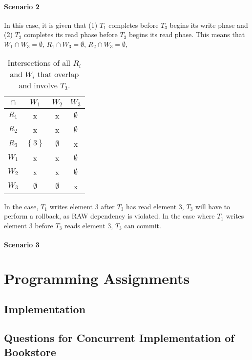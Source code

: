 \documentclass[11pt,a4paper,english]{article}
\begin{document}
\paragraph{Scenario 2} In this case, it is given that (1) $T_{1}$ completes before $T_{3}$ begins its write phase and (2) $T_{2}$ completes its read phase before $T_{3}$ begins its read phase. This means that $W_{1} \cap W_{3} = \emptyset$, $R_{1} \cap W_{3} = \emptyset$, $R_{2} \cap W_{3} = \emptyset$, 
\begin{table}[!hbt]
\centering
\begin{tabular}{|c|c|c|c|}
\hline
$\cap$  & $W_{1}$ & $W_{2}$ & $W_{3}$    \\ \hline
$R_{1}$ & x  & x  & $\emptyset$ \\ \hline
$R_{2}$ & x  & x  & $\emptyset$ \\ \hline
$R_{3}$ & $\left\{ 3 \right\}$ & $\emptyset$ & x \\ \hline
$W_{1}$ & x  & x  & $\emptyset$ \\ \hline
$W_{2}$ & x  & x  & $\emptyset$ \\ \hline
$W_{3}$ & $\emptyset$ & $\emptyset$ & x \\ \hline
\end{tabular}
\caption{Intersections of all $R_{i}$ and $W_{i}$ that overlap and involve $T_{3}$.}
\label{tbl:scenario1}
\end{table}

In the case, $T_{1}$ writes element $3$ after $T_{3}$ has read element $3$, $T_{3}$ will have to perform a rollback, as RAW dependency is violated. In the case where $T_{1}$ writes element $3$ before $T_{3}$ reads element $3$, $T_{3}$ can commit.


\paragraph{Scenario 3}

\section{Programming Assignments}
\subsection{Implementation}

\subsection{Questions for Concurrent Implementation of Bookstore}
\end{document}
